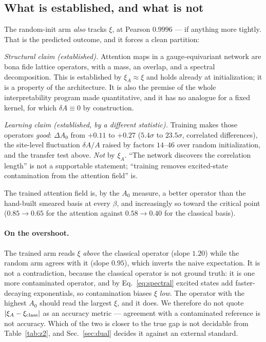 \documentclass[aps,prl,reprint,superscriptaddress,nofootinbib]{revtex4-2}
\newcommand{\xiA}{\xi_A}
\begin{document}
\subsection{What is established, and what is not}

The random-init arm \emph{also} tracks $\xi$, at Pearson $0.9996$ --- if anything
more tightly. That is the predicted outcome, and it forces a clean partition:

\emph{Structural claim (established).} Attention maps in a gauge-equivariant
network are bona fide lattice operators, with a mass, an overlap, and a spectral
decomposition. This is established by $\xiA\approx\xi$ and holds already at
initialization; it is a property of the architecture. It is also the premise of
the whole interpretability program made quantitative, and it has no analogue for
a fixed kernel, for which $\delta A\equiv0$ by construction.

\emph{Learning claim (established, by a different statistic).} Training makes
those operators \emph{good}: $\Delta A_0$ from $+0.11$ to $+0.27$
($5.4\sigma$ to $23.5\sigma$, correlated differences), the site-level
fluctuation $\delta A/A$ raised by factors $14$--$46$ over random
initialization, and the transfer test above. \emph{Not} by $\xiA$.
``The network discovers the correlation length'' is not a supportable statement;
``training removes excited-state contamination from the attention field'' is.

The trained attention field is, by the $A_0$ measure, a better operator than the
hand-built smeared basis at every $\beta$, and increasingly so toward the
critical point ($0.85\to0.65$ for the attention against $0.58\to0.40$ for the
classical basis).

\paragraph{On the overshoot.} The trained arm reads $\xi$ \emph{above} the
classical operator (slope $1.20$) while the random arm agrees with it (slope
$0.95$), which inverts the naive expectation. It is not a contradiction, because
the classical operator is not ground truth: it is one more contaminated
operator, and by Eq.~\eqref{eq:spectral} excited states add faster-decaying
exponentials, so contamination biases $\xi$ \emph{low}. The operator with the
highest $A_0$ should read the largest $\xi$, and it does. We therefore do not
quote $|\xiA-\xi_{\rm class}|$ as an accuracy metric --- agreement with a
contaminated reference is not accuracy. Which of the two is closer to the true
gap is not decidable from Table~\ref{tab:z2}, and Sec.~\ref{sec:dual} decides it
against an external standard.
\end{document}
